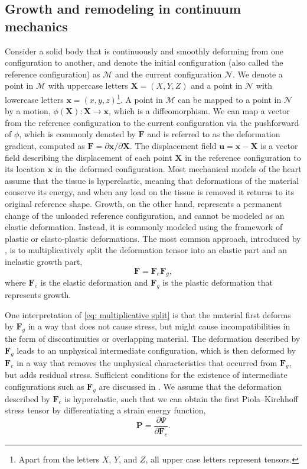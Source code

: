 \subsection{Growth and remodeling in continuum mechanics}
Consider a solid body that is continuously and smoothly deforming from one configuration to another, and denote the initial configuration (also called the reference configuration) as $\mathcal{M}$ and the current configuration $\mathcal{N}$. We denote a point in $\mathcal{M}$ with uppercase letters $\mathbf{X} = (X, Y, Z)$ and a point in $\mathcal{N}$ with lowercase letters $\mathbf{x} = (x, y, z)$\footnote{Apart from the letters $X$, $Y$, and $Z$, all upper case letters represent tensors.}. A point in $\mathcal{M}$ can be mapped to a point in $\mathcal{N}$ by a motion, $\phi(\mathbf{X}): \mathbf{X} \rightarrow \mathbf{x}$, which is a diffeomorphism. We can map a vector from the reference configuration to the current configuration via the pushforward of $\phi$, which is commonly denoted by $\mathbf{F}$ and is referred to as the deformation gradient, computed as $\mathbf{F} = \partial\mathbf{x}/\partial\mathbf{X}$. The displacement field $\mathbf{u} = \mathbf{x} - \mathbf{X}$ is a vector field describing the displacement of each point $\mathbf{X}$ in the reference configuration to its location $\mathbf{x}$ in the deformed configuration. 
Most mechanical models of the heart assume that the tissue is hyperelastic, meaning that deformations of the material conserve its energy, and when any load on the tissue is removed it returns to its original reference shape. Growth, on the other hand, represents a permanent change of the unloaded reference configuration, and cannot be modeled as an elastic deformation. Instead, it is commonly modeled using the framework of plastic or elasto-plastic deformations. The most common approach, introduced by \citep{Rodriguez1994}, is to multiplicatively split the deformation tensor into an elastic part and an inelastic growth part, 
\begin{equation}
\label{eq: multiplicative split}
    \mathbf{F} = \mathbf{F}_e\mathbf{F}_g,
\end{equation}
where $\mathbf{F}_e$ is the elastic deformation and $\mathbf{F}_g$ is the plastic deformation that represents growth. 

One interpretation of \ref{eq: multiplicative split} is that the material first deforms by $\mathbf{F}_g$ in a way that does not cause stress, but might cause incompatibilities in the form of discontinuities or overlapping material. The deformation described by $\mathbf{F}_g$ leads to an unphysical intermediate configuration, which is then deformed by $\mathbf{F}_e$ in a way that removes the unphysical characteristics that occurred from $\mathbf{F}_g$, but adds residual stress. Sufficient conditions for the existence of intermediate configurations such as $\mathbf{F}_g$ are discussed in \citep{Goodbrake2021}. We assume that the deformation described by $\mathbf{F}_e$ is hyperelastic, such that we can obtain the first Piola–Kirchhoff stress tensor by differentiating a strain energy function,
\begin{equation}
\label{eq: stress}
    \mathbf{P} = \frac{\partial\Psi}{\partial \mathbf{F}_e}.
\end{equation}

